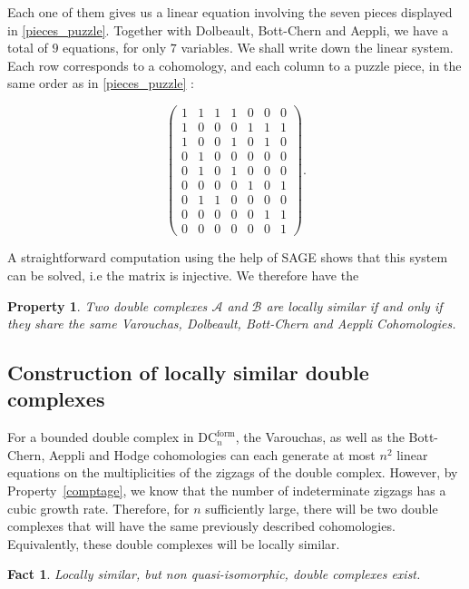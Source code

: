 \documentclass[leqno]{article}
\newtheorem{Property}[equation]{Property}
\newtheorem{Fact}[equation]{Fact}
\theoremstyle{definition}
\numberwithin{equation}{section}
\begin{document}
Each one of them gives us a linear equation involving the seven pieces displayed in \eqref{pieces_puzzle}. Together with Dolbeault, Bott-Chern and Aeppli, we have a total of $9$ equations, for only $7$ variables. We shall write down the linear system. Each row corresponds to a cohomology, and each column to a puzzle piece, in the same order as in \eqref{pieces_puzzle} :

\[
\begin{pmatrix}
1 & 1 & 1 & 1 & 0 & 0 & 0 \\
1 & 0 & 0 & 0 & 1 & 1 & 1 \\
1 & 0 & 0 & 1 & 0 & 1 & 0 \\
0 & 1 & 0 & 0 & 0 & 0 & 0 \\
0 & 1 & 0 & 1 & 0 & 0 & 0 \\
0 & 0 & 0 & 0 & 1 & 0 & 1 \\
0 & 1 & 1 & 0 & 0 & 0 & 0 \\
0 & 0 & 0 & 0 & 0 & 1 & 1 \\
0 & 0 & 0 & 0 & 0 & 0 & 1
\end{pmatrix} .
\]

A straightforward computation using the help of SAGE shows that this system can be solved, i.e the matrix is injective. We therefore have the
\begin{Property}
Two double complexes $\mathcal{A}$ and $\mathcal{B}$ are locally similar if and only if they share the same Varouchas, Dolbeault, Bott-Chern and Aeppli Cohomologies.
\end{Property}

\subsection{Construction of locally similar double complexes}
For a bounded double complex in $\text{DC}^{\text{form}}_n$, the Varouchas, as well as the Bott-Chern, Aeppli and Hodge cohomologies can each generate at most $n^2$ linear equations on the multiplicities of the zigzags of the double complex. However, by Property~\ref{comptage}, we know that the number of indeterminate zigzags has a cubic growth rate. Therefore, for $n$ sufficiently large, there will be two double complexes that will have the same previously described cohomologies. Equivalently, these double complexes will be locally similar.
 \begin{Fact}
Locally similar, but non quasi-isomorphic, double complexes exist.
\end{Fact}
\end{document}
